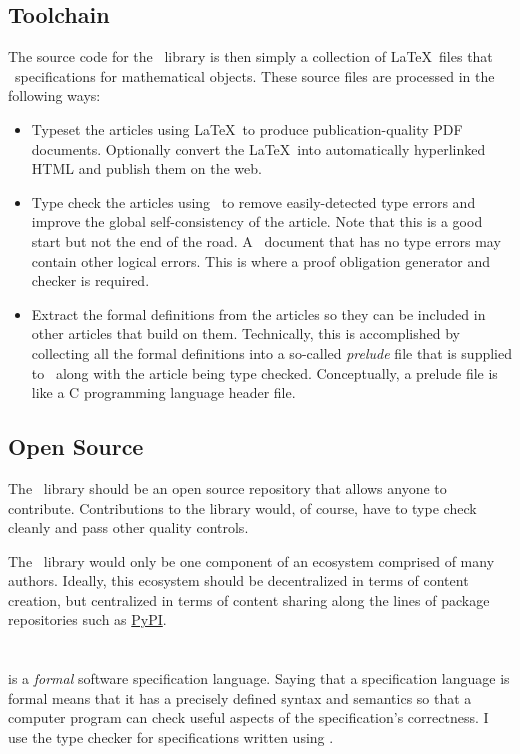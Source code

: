 \documentclass{amsart}
\begin{document}
\subsection{Toolchain}

The source code for the \mathz\ library is then simply a collection of \LaTeX\ files that \ZN\ specifications for mathematical objects.
These source files are processed in the following ways:
\begin{itemize}
\item Typeset the articles using \LaTeX\ to produce publication-quality PDF documents.
Optionally convert the \LaTeX\ into automatically hyperlinked HTML and publish them on the web.
\item Type check the articles using \fuzz\ to remove easily-detected type errors and improve the global self-consistency of the article.
Note that this is a good start but not the end of the road. 
A \ZN\ document that has no type errors may contain other logical errors.
This is where a proof obligation generator and checker is required.
\item Extract the formal definitions from the articles so they can be included in other articles that build on them.
Technically, this is accomplished by collecting all the formal definitions into a so-called \textit{prelude} file that
is supplied to \fuzz\ along with the article being type checked.
Conceptually, a prelude file is like a C programming language header file.
\end{itemize}

\subsection{Open Source}

The \mathz\ library should be an open source repository that allows anyone to contribute.
Contributions to the library would, of course, have to type check cleanly and pass other quality controls.

The \mathz\ library would only be one component of an ecosystem comprised of many authors.
Ideally, this ecosystem should be decentralized in terms of content creation, but centralized in terms
of content sharing along the lines of package repositories such as \href{https://pypi.org}{PyPI}.

\section{\ZN}

\ZN\cite{spivey-zrm} is a \textit{formal} software specification language.
Saying that a specification language is formal means that it has a precisely defined syntax and semantics so that 
a computer program can check useful aspects of the specification's correctness.
I use the \fuzz\cite{spivey-fm} type checker for specifications written using \ZN.
\end{document}
